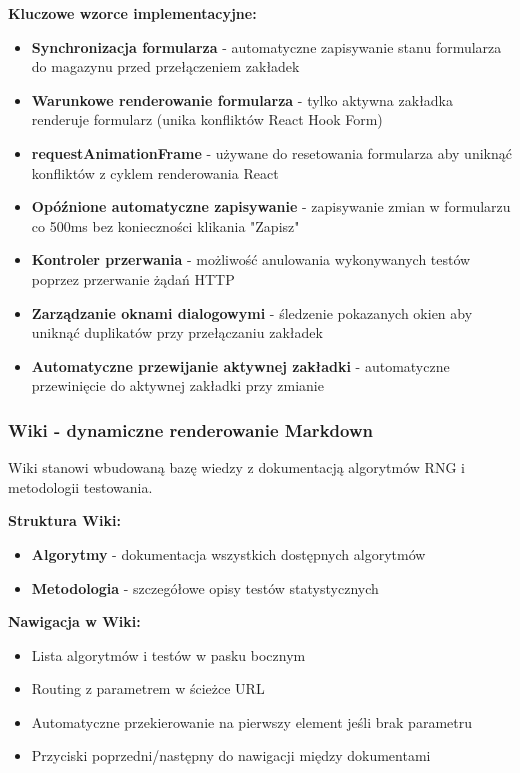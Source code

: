 \documentclass[12pt,a4paper]{article}
\begin{document}
\textbf{Kluczowe wzorce implementacyjne:}

\begin{itemize}
    \item \textbf{Synchronizacja formularza} - automatyczne zapisywanie stanu formularza do magazynu przed przełączeniem zakładek
    \item \textbf{Warunkowe renderowanie formularza} - tylko aktywna zakładka renderuje formularz (unika konfliktów React Hook Form)
    \item \textbf{requestAnimationFrame} - używane do resetowania formularza aby uniknąć konfliktów z cyklem renderowania React
    \item \textbf{Opóźnione automatyczne zapisywanie} - zapisywanie zmian w formularzu co 500ms bez konieczności klikania "Zapisz"
    \item \textbf{Kontroler przerwania} - możliwość anulowania wykonywanych testów poprzez przerwanie żądań HTTP
    \item \textbf{Zarządzanie oknami dialogowymi} - śledzenie pokazanych okien aby uniknąć duplikatów przy przełączaniu zakładek
    \item \textbf{Automatyczne przewijanie aktywnej zakładki} - automatyczne przewinięcie do aktywnej zakładki przy zmianie
\end{itemize}

\subsubsection{Wiki - dynamiczne renderowanie Markdown}

Wiki stanowi wbudowaną bazę wiedzy z dokumentacją algorytmów RNG i metodologii testowania.

\textbf{Struktura Wiki:}

\begin{itemize}
    \item \textbf{Algorytmy} - dokumentacja wszystkich dostępnych algorytmów
    \item \textbf{Metodologia} - szczegółowe opisy testów statystycznych
\end{itemize}

\textbf{Nawigacja w Wiki:}
\begin{itemize}
    \item Lista algorytmów i testów w pasku bocznym
    \item Routing z parametrem w ścieżce URL
    \item Automatyczne przekierowanie na pierwszy element jeśli brak parametru
    \item Przyciski poprzedni/następny do nawigacji między dokumentami
\end{itemize}
\end{document}
